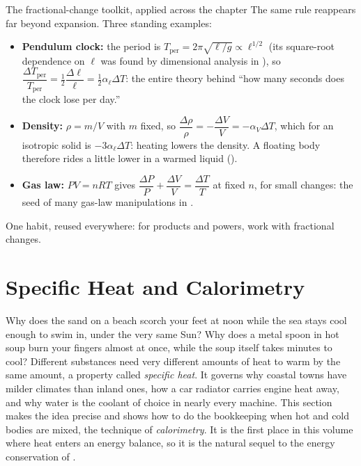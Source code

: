 \begin{keybox}{The fractional-change toolkit, applied across the chapter}
The same rule reappears far beyond expansion. Three standing examples:
\begin{itemize}
\item \textbf{Pendulum clock:} the period is $T_{\text{per}} = 2\pi\sqrt{\ell/g}\propto \ell^{1/2}$
      (its square-root dependence on $\ell$ was found by dimensional analysis in ), so
      $\dfrac{\Delta T_{\text{per}}}{T_{\text{per}}} = \tfrac12\dfrac{\Delta \ell}{\ell}
      = \tfrac12\alpha_\ell\Delta T$: the entire theory behind ``how many seconds does the clock lose
      per day.''
\item \textbf{Density:} $\rho = m/V$ with $m$ fixed, so
      $\dfrac{\Delta\rho}{\rho} = -\dfrac{\Delta V}{V} = -\alpha_V\Delta T$, which for an isotropic
      solid is $-3\alpha_\ell\Delta T$: heating lowers the density. A floating body therefore rides a
      little lower in a warmed liquid ().
\item \textbf{Gas law:} $PV = nRT$ gives
      $\dfrac{\Delta P}{P} + \dfrac{\Delta V}{V} = \dfrac{\Delta T}{T}$ at fixed $n$, for small
      changes: the seed of many gas-law manipulations in .
\end{itemize}
One habit, reused everywhere: for products and powers, work with fractional changes.
\end{keybox}

\section{Specific Heat and Calorimetry}\label{sec:calorimetry}

Why does the sand on a beach scorch your feet at noon while the sea stays cool enough to swim in,
under the very same Sun? Why does a metal spoon in hot soup burn your fingers almost at once, while the
soup itself takes minutes to cool? Different substances need very different amounts of heat to warm by
the same amount, a property called \emph{specific heat}. It governs why coastal towns have milder
climates than inland ones, how a car radiator carries engine heat away, and why water is the coolant of
choice in nearly every machine. This section makes the idea precise and shows how to do the
bookkeeping when hot and cold bodies are mixed, the technique of \emph{calorimetry}. It is the first
place in this volume where heat enters an energy balance, so it is the natural sequel to the energy
conservation of .

